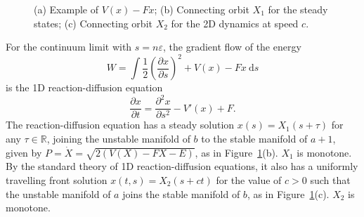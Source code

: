 \documentclass[12pt]{article}
\newcommand{\R}{\mathbb{R}}
\newcommand{\eps}{\varepsilon}
\begin{document}
\begin{figure}[htbp]


   \caption{(a) Example of $V(x)-Fx$;  (b) Connecting orbit $X_1$ for the steady states; (c) Connecting orbit $X_2$ for the 2D dynamics at speed $c$.}
   \label{fig:appB}
\end{figure}

For the continuum limit with $s = n\eps$, the gradient flow %
of the energy
$$W = \int \frac12 \left(\frac{\partial x}{\partial s}\right)^2 + V(x)-Fx \ \mbox{d}s$$
is the 1D reaction-diffusion equation
\begin{equation}\label{diffusion}
\frac{\partial x}{\partial t} = \frac{\partial^2 x}{\partial s^2} - V'(x)+F.
\end{equation}
The reaction-diffusion equation has a steady solution %
 $x(s)=X_1(s+\tau)$ for any $\tau \in \R$, joining the unstable manifold of $b$ to the stable manifold of $a+1$, given by $P=\dot{X} = \sqrt{2(V(X)-FX-E)}$, as in Figure~\ref{fig:appB}(b).  $X_1$ is monotone.
By the standard theory of 1D reaction-diffusion equations, it also has a uniformly travelling front solution $x(t,s) = X_2(s+ct)$ for the value of $c>0$ such that the unstable manifold of $a$ joins the stable manifold of $b$, as in Figure~\ref{fig:appB}(c).  $X_2$ is monotone.
\end{document}
